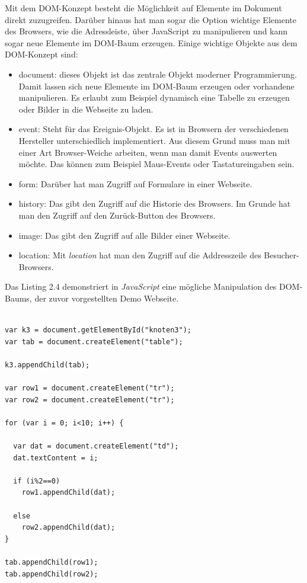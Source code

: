 Mit dem DOM-Konzept besteht die M\"oglichkeit auf Elemente im Dokument direkt zuzugreifen.
Dar\"uber hinaus hat man sogar die Option wichtige Elemente des Browsers, wie die Adressleiste, \"uber JavaScript zu manipulieren
und kann sogar neue Elemente im DOM-Baum erzeugen.
Einige wichtige Objekte aus dem DOM-Konzept sind:
\begin{itemize}
 \item document: dieses Objekt ist das zentrale Objekt moderner Programmierung. 
 Damit lassen sich neue Elemente im DOM-Baum erzeugen oder vorhandene manipulieren. 
 Es erlaubt zum Beispiel dynamisch eine Tabelle zu erzeugen oder Bilder in die Webseite zu laden.
 \item event: Steht f\"ur das Ereignis-Objekt. 
 Es ist in Browsern der verschiedenen Hersteller unterschiedlich implementiert.
 Aus diesem Grund muss man mit einer Art Browser-Weiche arbeiten, wenn man damit Events auswerten m\"ochte.
 Das k\"onnen zum Beispiel Maus-Events oder Tastatureingaben sein.
 \item form: Dar\"uber hat man Zugriff auf Formulare in einer Webseite.
 \item history: Das gibt den Zugriff auf die Historie des Browsers. 
 Im Grunde hat man den Zugriff auf den Zur\"uck-Button des Browsers.
 \item image: Das gibt den Zugriff auf alle Bilder einer Webseite.
 \item location: Mit \emph{location} hat man den Zugriff auf die Addresszeile des Besucher-Browsers.
\end{itemize}

Das Listing 2.4 demonstriert in \emph{JavaScript} eine m\"ogliche Manipulation des DOM-Baums,
der zuvor vorgestellten Demo Webseite.\\

\begin{lstlisting}[caption={Beispiel f\"ur dynamischen Zugriff auf den DOM-Baum}]

var k3 = document.getElementById("knoten3"); 
var tab = document.createElement("table");

k3.appendChild(tab);

var row1 = document.createElement("tr");
var row2 = document.createElement("tr");

for (var i = 0; i<10; i++) {

  var dat = document.createElement("td");
  dat.textContent = i;
  
  if (i%2==0)  
    row1.appendChild(dat);
    
  else  
    row2.appendChild(dat);
}

tab.appendChild(row1);
tab.appendChild(row2);
\end{lstlisting}

